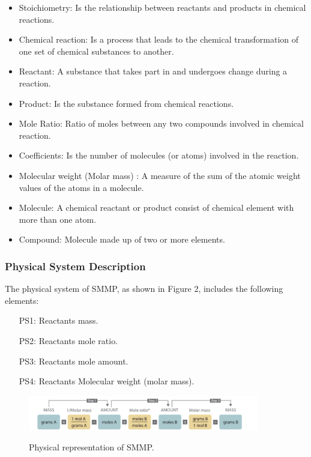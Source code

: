 \documentclass[12pt]{article}
\begin{document}
\begin{itemize}

\item Stoichiometry:  Is the relationship between reactants and products in chemical reactions.
\item Chemical reaction: Is a process that leads to the chemical transformation of one set of chemical substances to another.
\item Reactant: A substance that takes part in and undergoes change during a reaction.
\item Product:  Is the substance formed from chemical reactions.
\item Mole Ratio: Ratio of moles between any two compounds involved in chemical reaction.
\item Coefficients: Is the number of molecules (or atoms) involved in the reaction.
\item Molecular weight (Molar mass) :  A measure of the sum of the atomic weight values of the atoms in a molecule. 
\item Molecule: A chemical reactant or product consist of chemical element with more than one atom.
\item Compound: Molecule made up of two or more elements.

\end{itemize}

\subsubsection{Physical System Description} \label{sec_phySystDescrip}

The physical system of SMMP, as shown in Figure 2,
includes the following elements:

\begin{itemize}

\item[PS1:] Reactants mass.\\
\item[PS2:] Reactants mole ratio.\\
\item[PS3:] Reactants mole amount.\\
\item[PS4:] Reactants Molecular weight (molar mass).\\

\end{itemize}

 \begin{figure}[h!]
 \begin{center}
 {
  \includegraphics[width=0.9\textwidth]{physical}
 }
 \caption{\label{ Figure 2:} Physical representation of SMMP.}
 \end{center}
 \end{figure}
\end{document}
